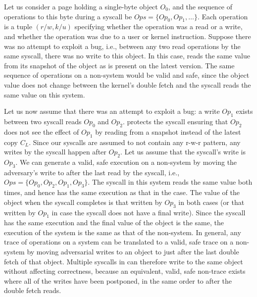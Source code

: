 \documentclass[letterpaper,twocolumn,10pt]{article}
\begin{document}
Let us consider a page holding a single-byte object $O_0$, and the 
sequence of operations to this byte during a \tiktok syscall be 
$Ops = \{Op_0, Op_1, \dots \}$. 
Each operation is a tuple $(r/w, k/u)$ specifying whether the 
operation was a read or a write, and whether the operation was due to 
a user or kernel instruction.
Suppose there was no attempt to exploit a \tocttou bug, i.e., between
any two read operations by the same syscall, there was no write to 
this object.
In this case, \tiktok reads the same value from its snapshot of the 
object as is present on the latest version. 
The same sequence of operations on a non-\tiktok system would be valid and
safe, since the object value does not change between the kernel's double 
fetch and the syscall reads the same value on this system.

Let us now
%
assume that there was an attempt to exploit a \tocttou bug:
a write $Op_1$ exists between two syscall reads $Op_0$ and $Op_2$.
\tiktok protects the syscall ensuring that $Op_2$ does not see the 
effect of $Op_1$ by reading from a snapshot instead of the latest 
copy $C_L$. 
Since our syscalls are assumed to not contain any r-w-r pattern, 
any writes by the syscall happen after $Op_2$.
Let us assume that the syscall's write is $Op_3$.
We can generate a valid, safe execution on a non-\tiktok system 
by moving the adversary's write to after the last read by the 
syscall, i.e., $Ops = \{Op_0, Op_2, Op_1, Op_3\}$.
The syscall in this system reads the same value both times, and 
hence has the same execution as that in the \tiktok case.
The value of the object when the syscall completes is that 
written by $Op_3$ in both cases (or that written by $Op_1$ in 
case the syscall does not have a final write).
Since the syscall has the same execution and the final value of 
the object is the same, the execution of the \tiktok system 
is the same as that of the non-\tiktok system.
In general, any trace of operations on a \tiktok system can 
be translated  to a valid, safe trace on a non-\tiktok system 
by moving adversarial writes to an object to just after the last
double fetch of that object.
Multiple syscalls in \tiktok can therefore write to the same object 
without affecting 
correctness, because an equivalent, valid, safe non-\tiktok trace 
exists where all of the writes have been postponed, in the same order 
to after the double fetch reads. 
\end{document}
